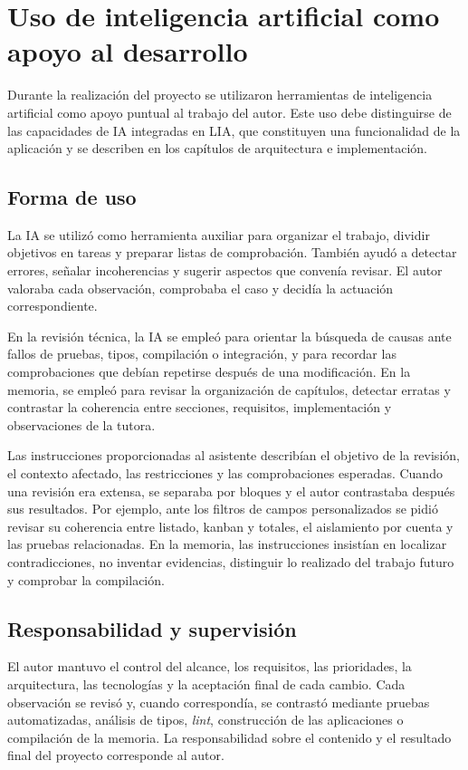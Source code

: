 \chapter{Uso de inteligencia artificial como apoyo al desarrollo}
\label{appendix:ai-assisted-development}

Durante la realización del proyecto se utilizaron herramientas de inteligencia
artificial como apoyo puntual al trabajo del autor. Este uso debe distinguirse
de las capacidades de IA integradas en LIA, que constituyen una funcionalidad
de la aplicación y se describen en los capítulos de arquitectura e
implementación.

\section{Forma de uso}

La IA se utilizó como herramienta auxiliar para organizar el trabajo, dividir
objetivos en tareas y preparar listas de comprobación. También ayudó a detectar
errores, señalar incoherencias y sugerir aspectos que convenía revisar. El
autor valoraba cada observación, comprobaba el caso y decidía la actuación
correspondiente.

En la revisión técnica, la IA se empleó para orientar la búsqueda de causas
ante fallos de pruebas, tipos, compilación o integración, y para recordar las
comprobaciones que debían repetirse después de una modificación. En la memoria,
se empleó para revisar la organización de capítulos, detectar erratas y
contrastar la coherencia entre secciones, requisitos, implementación y
observaciones de la tutora.

Las instrucciones proporcionadas al asistente describían el objetivo de la
revisión, el contexto afectado, las restricciones y las comprobaciones
esperadas. Cuando una revisión era extensa, se separaba por bloques y el autor
contrastaba después sus resultados. Por ejemplo, ante los filtros de campos
personalizados se pidió revisar su coherencia entre listado, kanban y totales,
el aislamiento por cuenta y las pruebas relacionadas. En la memoria, las
instrucciones insistían en localizar contradicciones, no inventar evidencias,
distinguir lo realizado del trabajo futuro y comprobar la compilación.

\section{Responsabilidad y supervisión}

El autor mantuvo el control del alcance, los requisitos, las prioridades, la
arquitectura, las tecnologías y la aceptación final de cada cambio. Cada
observación se revisó y, cuando correspondía, se contrastó mediante pruebas
automatizadas, análisis de tipos, \emph{lint}, construcción de las aplicaciones
o compilación de la memoria. La responsabilidad sobre el contenido y el
resultado final del proyecto corresponde al autor.
